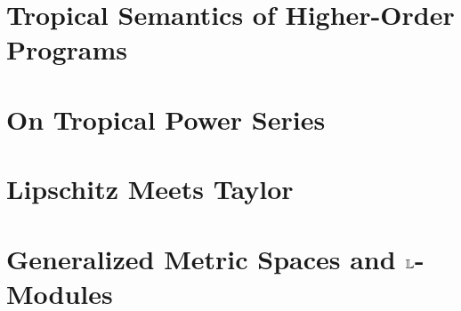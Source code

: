 \documentclass[a4paper,english, UKenglish,cleveref, autoref, thm-restate]{lipics-v2021}
\begin{document}
\section{Tropical Semantics of Higher-Order Programs}\label{section3}


%
%
%


\section{On Tropical Power Series}\label{sec:tls}



\section{Lipschitz Meets Taylor}\label{sec:TayLip}


\section{Generalized Metric Spaces and $\mathbb{L}$-Modules}\label{sec:GMS}

\end{document}
